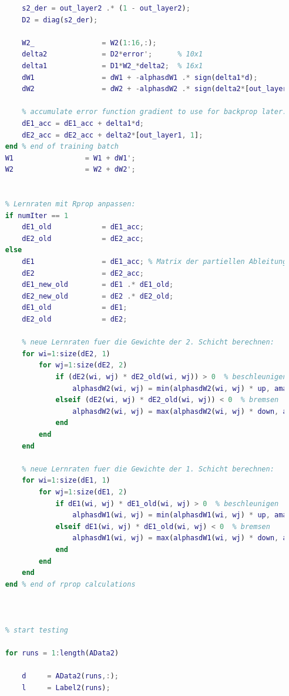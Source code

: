 \documentclass[12pt]{article}
\begin{document}
\begin{lstlisting}[language=Matlab]
        % backward pass - layer 2
        s2_der = out_layer2 .* (1 - out_layer2);
        D2 = diag(s2_der);
        
        W2_                = W2(1:16,:);
        delta2             = D2*error';      % 10x1
        delta1             = D1*W2_*delta2;  % 16x1
        dW1                = dW1 + -alphasdW1 .* sign(delta1*d);
        dW2                = dW2 + -alphasdW2 .* sign(delta2*[out_layer1, 1]);

        % accumulate error function gradient to use for backprop later:
        dE1_acc = dE1_acc + delta1*d;
        dE2_acc = dE2_acc + delta2*[out_layer1, 1];
    end % end of training batch
    W1                 = W1 + dW1';
    W2                 = W2 + dW2';
    
        
    % Lernraten mit Rprop anpassen:
    if numIter == 1
        dE1_old            = dE1_acc;
        dE2_old            = dE2_acc;
    else
        dE1                = dE1_acc; % Matrix der partiellen Ableitungen von E1 nach dem i-ten Gewicht sein
        dE2                = dE2_acc;
        dE1_new_old        = dE1 .* dE1_old;
        dE2_new_old        = dE2 .* dE2_old;
        dE1_old            = dE1;
        dE2_old            = dE2;
        
        % neue Lernraten fuer die Gewichte der 2. Schicht berechnen:
        for wi=1:size(dE2, 1)
            for wj=1:size(dE2, 2)
                if (dE2(wi, wj) * dE2_old(wi, wj)) > 0  % beschleunigen
                    alphasdW2(wi, wj) = min(alphasdW2(wi, wj) * up, amax);
                elseif (dE2(wi, wj) * dE2_old(wi, wj)) < 0  % bremsen
                    alphasdW2(wi, wj) = max(alphasdW2(wi, wj) * down, amin);
                end
            end
        end
        
        % neue Lernraten fuer die Gewichte der 1. Schicht berechnen:
        for wi=1:size(dE1, 1)
            for wj=1:size(dE1, 2)
                if dE1(wi, wj) * dE1_old(wi, wj) > 0  % beschleunigen
                    alphasdW1(wi, wj) = min(alphasdW1(wi, wj) * up, amax);
                elseif dE1(wi, wj) * dE1_old(wi, wj) < 0  % bremsen
                    alphasdW1(wi, wj) = max(alphasdW1(wi, wj) * down, amin);
                end
            end
        end
    end % end of rprop calculations
    
    
    
    % start testing
    
    for runs = 1:length(AData2)
        
        d     = AData2(runs,:);
        l     = Label2(runs);
            

\end{lstlisting}
\end{document}
